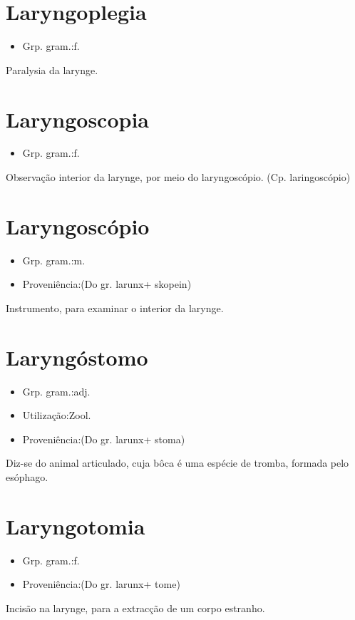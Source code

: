 \section{Laryngoplegia}
\begin{itemize}
\item {Grp. gram.:f.}
\end{itemize}
Paralysia da larynge.
\section{Laryngoscopia}
\begin{itemize}
\item {Grp. gram.:f.}
\end{itemize}
Observação interior da larynge, por meio do laryngoscópio.
(Cp. \textunderscore laringoscópio\textunderscore )
\section{Laryngoscópio}
\begin{itemize}
\item {Grp. gram.:m.}
\end{itemize}
\begin{itemize}
\item {Proveniência:(Do gr. \textunderscore larunx\textunderscore  + \textunderscore skopein\textunderscore )}
\end{itemize}
Instrumento, para examinar o interior da larynge.
\section{Laryngóstomo}
\begin{itemize}
\item {Grp. gram.:adj.}
\end{itemize}
\begin{itemize}
\item {Utilização:Zool.}
\end{itemize}
\begin{itemize}
\item {Proveniência:(Do gr. \textunderscore larunx\textunderscore  + \textunderscore stoma\textunderscore )}
\end{itemize}
Diz-se do animal articulado, cuja bôca é uma espécie de tromba, formada pelo esóphago.
\section{Laryngotomia}
\begin{itemize}
\item {Grp. gram.:f.}
\end{itemize}
\begin{itemize}
\item {Proveniência:(Do gr. \textunderscore larunx\textunderscore  + \textunderscore tome\textunderscore )}
\end{itemize}
Incisão na larynge, para a extracção de um corpo estranho.
